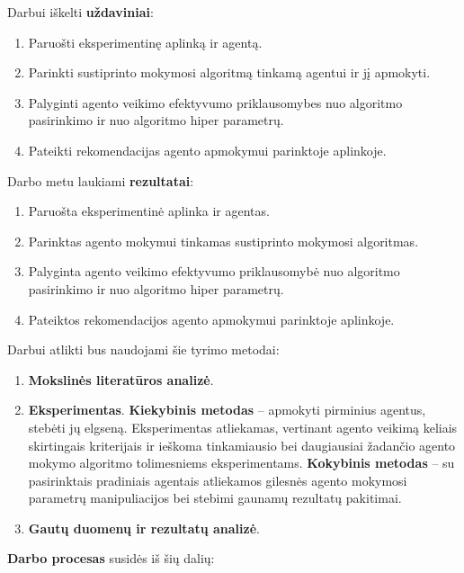 \documentclass{VUMIFPSbakalaurinis}
\begin{document}
Darbui iškelti \textbf{uždaviniai}:\par

\begin{enumerate}
	\item Paruošti eksperimentinę aplinką ir agentą.
	\item Parinkti sustiprinto mokymosi algoritmą tinkamą agentui ir jį apmokyti.
	\item Palyginti agento veikimo efektyvumo priklausomybes nuo algoritmo pasirinkimo ir nuo algoritmo hiper parametrų.
	\item Pateikti rekomendacijas agento apmokymui parinktoje aplinkoje.
\end{enumerate}

Darbo metu laukiami \textbf{rezultatai}:

\begin{enumerate}
	\item Paruošta eksperimentinė aplinka ir agentas.
	\item Parinktas agento mokymui tinkamas sustiprinto mokymosi algoritmas.
	\item Palyginta agento veikimo efektyvumo priklausomybė nuo algoritmo pasirinkimo ir nuo algoritmo hiper parametrų.
	\item Pateiktos rekomendacijos agento apmokymui parinktoje aplinkoje.
\end{enumerate}

Darbui atlikti bus naudojami šie tyrimo metodai:

\begin{enumerate}
	\item \textbf{Mokslinės literatūros analizė}.
	\item \textbf{Eksperimentas}.
	\subitem \textbf{Kiekybinis metodas} -- apmokyti pirminius agentus, stebėti jų elgseną. Eksperimentas atliekamas, vertinant agento veikimą keliais skirtingais kriterijais ir ieškoma tinkamiausio bei daugiausiai žadančio agento mokymo algoritmo tolimesniems eksperimentams.
	\subitem \textbf{Kokybinis metodas} -- su pasirinktais pradiniais agentais atliekamos gilesnės agento mokymosi parametrų manipuliacijos bei stebimi gaunamų rezultatų pakitimai.
	\item \textbf{Gautų duomenų ir rezultatų analizė}.
\end{enumerate}

\textbf{Darbo procesas} susidės iš šių dalių:
\end{document}
